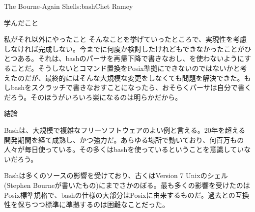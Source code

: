 \begin{aosachapter}{The Bourne-Again Shell}{s:bash}{Chet Ramey}
\begin{aosasect1}{学んだこと}
\begin{aosasect2}{私がそれ以外にやったこと}
そんなことを挙げていったところで、実現性を考慮しなければ完成しない。今までに何度か検討したけれどもできなかったことがひとつある。それは、bashのパーサを再帰下降で書きなおし、を使わないようにすることだ。そうしないとコマンド置換をPosix準拠にできないのではないかと考えたのだが、最終的にはそんな大規模な変更をしなくても問題を解決できた。もしbashをスクラッチで書きなおすことになったら、おそらくパーサは自分で書くだろう。そのほうがいろいろ楽になるのは明らかだから。

\end{aosasect2}

\end{aosasect1}

\begin{aosasect1}{結論}

Bashは、大規模で複雑なフリーソフトウェアのよい例と言える。20年を超える開発期間を経て成熟し、かつ強力だ。あらゆる場所で動いており、何百万もの人々が毎日使っている。その多くはbashを使っているということを意識していないだろう。

Bashは多くのソースの影響を受けており、古くはVersion 7 Unixのシェル(Stephen Bourneが書いたもの)にまでさかのぼる。最も多くの影響を受けたのはPosix標準規格で、bashの仕様の大部分はPosixに由来するものだ。過去との互換性を保ちつつ標準に準拠するのは困難なことだった。


\end{aosasect1}
\end{aosachapter}
